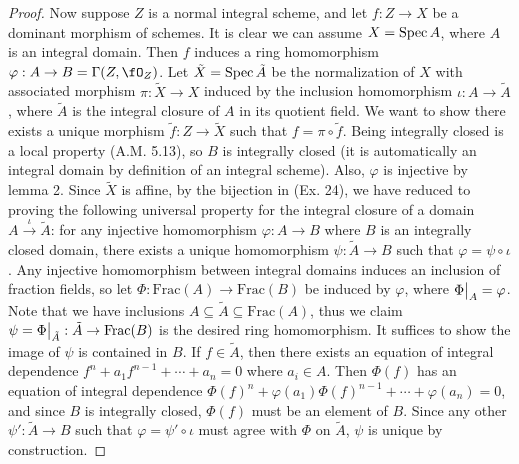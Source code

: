 \documentclass[a4paper]{article}
\begin{document}
\begin{enumerate} [label=\textbf{\arabic*.}, leftmargin=0em]
\begin{proof}
              Now suppose $Z$ is a normal integral scheme, and let $f : Z \to X$ be a dominant morphism of schemes. It is clear we can assume $X = \operatorname{Spec}{A}$, where $A$ is an integral domain. Then $f$ induces a ring homomorphism $\varphi : A \to B = \Gamma(Z, \fO_Z)$. Let $\tilde{X} = \operatorname{Spec}{\tilde{A}}$ be the normalization of $X$ with associated morphism $\pi : \tilde{X} \to X$ induced by the inclusion homomorphism $\iota : A \to \tilde{A}$, where $\tilde{A}$ is the integral closure of $A$ in its quotient field. We want to show there exists a unique morphism $\tilde{f} : Z \to \tilde{X}$ such that $f = \pi \circ \tilde{f}$. Being integrally closed is a local property (A.M. 5.13), so $B$ is integrally closed (it is automatically an integral domain by definition of an integral scheme). Also, $\varphi$ is injective by lemma 2. Since $\tilde{X}$ is affine, by the bijection in (Ex. 24), we have reduced to proving the following universal property for the integral closure of a domain $A \xrightarrow{\iota} \tilde{A}$: for any injective homomorphism $\varphi : A \to B$ where $B$ is an integrally closed domain, there exists a unique homomorphism $\psi : \tilde{A} \to B$ such that $\varphi = \psi \circ \iota$. Any injective homomorphism between integral domains induces an inclusion of fraction fields, so let $\Phi : \text{Frac}(A) \to \text{Frac}(B)$ be induced by $\varphi$, where $\restr{\Phi}{A} = \varphi$. Note that we have inclusions $A \subseteq \tilde{A} \subseteq \text{Frac}(A)$, thus we claim $\psi = \restr{\Phi}{\tilde{A}} : \tilde{A} \to \text{Frac}(B)$ is the desired ring homomorphism. It suffices to show the image of $\psi$ is contained in $B$. If $f \in \tilde{A}$, then there exists an equation of integral dependence $f^n + a_1 f^{n - 1} + \cdots + a_n = 0$ where $a_i \in A$. Then $\Phi(f)$ has an equation of integral dependence $\Phi(f)^n + \varphi(a_1) \Phi(f)^{n - 1} + \cdots + \varphi(a_n) = 0$, and since $B$ is integrally closed, $\Phi(f)$ must be an element of $B$. Since any other $\psi' : \tilde{A} \to B$ such that $\varphi = \psi' \circ \iota$ must agree with $\Phi$ on $\tilde{A}$, $\psi$ is unique by construction.
          \end{proof}


\end{enumerate}
\end{document}

